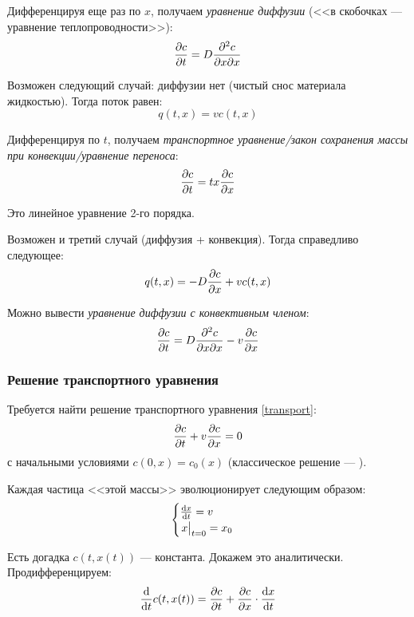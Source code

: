 Дифференцируя еще раз по $x$, получаем \emph{уравнение диффузии} (<<в скобочках --- уравнение теплопроводности>>):
%
\begin{equation}
  \pdv{c}{t} (t, x) = D \pdv{c}{x}{x} (t, x)
\end{equation}

Возможен следующий случай: диффузии нет (чистый снос материала жидкостью). Тогда поток равен:
%
\begin{equation}
  q(t, x) = vc(t, x)
\end{equation}

Дифференцируя по $t$, получаем \emph{транспортное уравнение/закон сохранения массы при конвекции/уравнение переноса}:
%
\begin{equation}
  \pdv{c}{t} (t, x) = tx \pdv{c}{x} (t, x) \label{transport}
\end{equation}

Это линейное уравнение 2-го порядка.

Возможен и третий случай (диффузия + конвекция). Тогда справедливо следующее:
%
\begin{equation}
  q(t, x) = -D \pdv{c}{x} (t, x) + v c(t, x)
\end{equation}

Можно вывести \emph{уравнение диффузии с конвективным членом}:
%
\begin{equation}
  \pdv{c}{t}(t, x) = D \pdv{c}{x}{x} (t, x) - v \pdv{c}{x} (t, x)
\end{equation}

\subsubsection{Решение транспортного уравнения}

Требуется найти решение транспортного уравнения \eqref{transport}:
%
\begin{equation}
  \pdv{c}{t} + v \pdv{c}{x} = 0 \label{transport2}
\end{equation}
%
с начальными условиями $c(0, x) = c_0(x)$ (классическое решение --- ).

Каждая частица <<этой массы>> эволюционирует следующим образом:
%
\begin{equation}
  \begin{cases}
    \dv{x}{t} = v \\
    \eval{x}_{t=0} = x_0
  \end{cases}
\end{equation}

Есть догадка $c(t, x(t))$ --- константа. Докажем это аналитически. Продифференцируем:
%
\begin{equation}
  \dv{t} c(t, x(t)) = \pdv{c}{t} (t, x(t)) + \pdv{c}{x} (t, x(t)) \cdot \dv{x}{t}
\end{equation}

